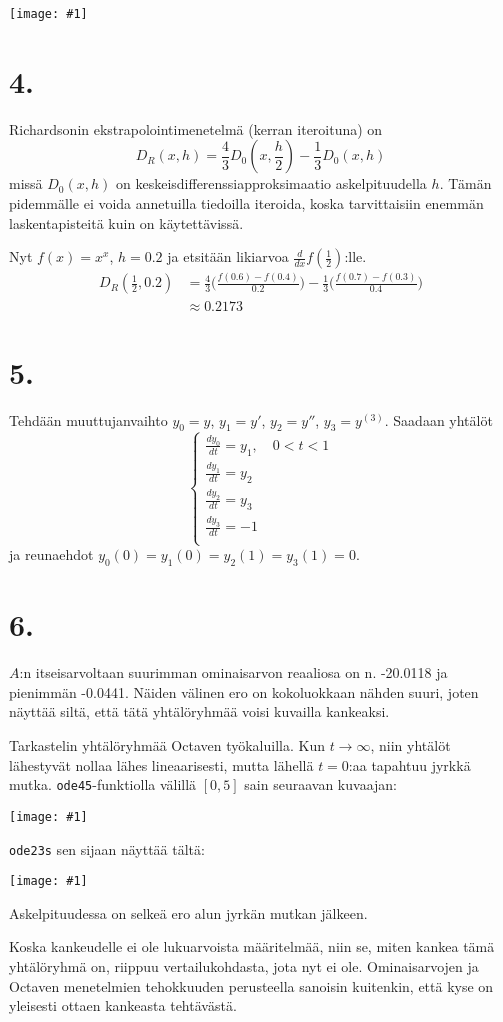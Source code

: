 \documentclass{article}
\newcommand{\img}[1]{
  \begin{center}
    \texttt{[image: \#1]}
  \end{center}
}
\begin{document}
\img{w6_3.jpg}


\section*{4.}

Richardsonin ekstrapolointimenetelmä (kerran iteroituna) on
\[
  D_R(x,h) = \frac{4}{3}D_0(x,\frac{h}{2}) - \frac{1}{3}D_0(x,h)
\]
missä $D_0(x,h)$ on keskeisdifferenssiapproksimaatio askelpituudella $h$.
Tämän pidemmälle ei voida annetuilla tiedoilla iteroida, koska
tarvittaisiin enemmän laskentapisteitä kuin on käytettävissä.

Nyt $f(x) = x^x$, $h = 0.2$ ja etsitään likiarvoa $\frac{d}{dx}f(\frac{1}{2})$:lle.
\begin{align*}
  D_R(\frac{1}{2}, 0.2) &= \frac{4}{3}\Big(\frac{f(0.6) - f(0.4)}{0.2}\Big)
  - \frac{1}{3}\Big(\frac{f(0.7) - f(0.3)}{0.4}\Big) \\
                        &\approx 0.2173
\end{align*}


\section*{5.}

Tehdään muuttujanvaihto $y_0 = y$, $y_1 = y'$, $y_2 = y''$, $y_3 = y^{(3)}$.
Saadaan yhtälöt
\[
  \begin{cases}
    \frac{dy_0}{dt} = y_1, \quad 0 < t < 1 \\
    \frac{dy_1}{dt} = y_2 \\
    \frac{dy_2}{dt} = y_3 \\
    \frac{dy_3}{dt} = -1 \\
  \end{cases}
\]
ja reunaehdot $y_0(0) = y_1(0) = y_2(1) = y_3(1) = 0$.


\section*{6.}

$A$:n itseisarvoltaan suurimman ominaisarvon reaaliosa on n. -20.0118
ja pienimmän -0.0441. Näiden välinen ero on kokoluokkaan nähden suuri,
joten näyttää siltä, että tätä yhtälöryhmää voisi kuvailla kankeaksi.

Tarkastelin yhtälöryhmää Octaven työkaluilla. Kun $t \rightarrow \infty$,
niin yhtälöt lähestyvät nollaa lähes lineaarisesti,
mutta lähellä $t=0$:aa tapahtuu jyrkkä mutka.
\verb#ode45#-funktiolla välillä $[0,5]$ sain seuraavan kuvaajan:

\img{w6_6_1.jpg}

\verb#ode23s# sen sijaan näyttää tältä:

\img{w6_6_2.jpg}

Askelpituudessa on selkeä ero alun jyrkän mutkan jälkeen.

Koska kankeudelle ei ole lukuarvoista määritelmää, niin se, miten kankea tämä
yhtälöryhmä on, riippuu vertailukohdasta, jota nyt ei ole.
Ominaisarvojen ja Octaven menetelmien tehokkuuden perusteella sanoisin kuitenkin,
että kyse on yleisesti ottaen kankeasta tehtävästä.
\end{document}

